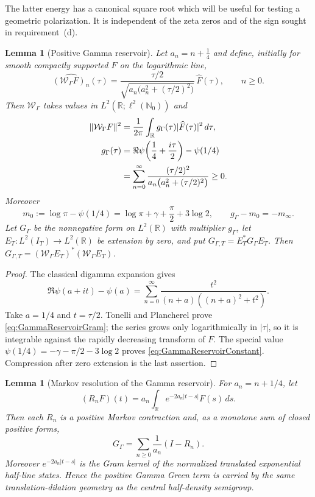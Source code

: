 \documentclass[11pt]{amsart}
\newtheorem{lemma}[theorem]{Lemma}
\theoremstyle{definition}
\theoremstyle{remark}
\newcommand{\R}{\mathbb R}
\begin{document}
The latter energy has a canonical square root which will be useful for
testing a geometric polarization.  It is independent of the zeta zeros and
of the sign sought in requirement~(d).

\begin{lemma}[Positive Gamma reservoir]
\label{lem:positiveGammaReservoir}
Let $a_n=n+\frac14$ and define, initially for smooth compactly supported
$F$ on the logarithmic line,
\begin{equation}\label{eq:GammaReservoirMap}
 \widehat{(\mathcal W_\Gamma F)_n}(\tau)
 =\frac{\tau/2}{
 \sqrt{a_n\bigl(a_n^2+(\tau/2)^2\bigr)}}\,\widehat F(\tau),
 \qquad n\ge0.
\end{equation}
Then $\mathcal W_\Gamma$ takes values in
$L^2(\mathbb R;\ell^2(\mathbb N_0))$ and
\begin{align}
 \|\mathcal W_\Gamma F\|^2
 &=\frac1{2\pi}\int_{\mathbb R}g_\Gamma(\tau)
       |\widehat F(\tau)|^2\,d\tau,\label{eq:GammaReservoirGram}\\
 g_\Gamma(\tau)
 &=\Re\psi\!\left(\frac14+\frac{i\tau}{2}\right)-\psi(1/4)
 \notag\\
 &=\sum_{n=0}^\infty
 \frac{(\tau/2)^2}
 {a_n\bigl(a_n^2+(\tau/2)^2\bigr)}\ge0.\notag
\end{align}
Moreover
\begin{equation}\label{eq:GammaReservoirConstant}
 m_0:=\log\pi-\psi(1/4)
 =\log\pi+\gamma+\frac\pi2+3\log2,
 \qquad g_\Gamma-m_0=-m_\infty.
\end{equation}
Let $G_\Gamma$ be the nonnegative form on $L^2(\R)$ with multiplier
$g_\Gamma$, let $E_T:L^2(I_T)\to L^2(\mathbb R)$ be extension by zero, and
put $G_{\Gamma,T}=E_T^*G_\Gamma E_T$.  Then
$G_{\Gamma,T}=(\mathcal W_\Gamma E_T)^*(\mathcal W_\Gamma E_T)$.
\end{lemma}

\begin{proof}
The classical digamma expansion gives
\[
 \Re\psi(a+it)-\psi(a)
 =\sum_{n=0}^\infty
 \frac{t^2}{(n+a)((n+a)^2+t^2)}.
\]
Take $a=1/4$ and $t=\tau/2$.  Tonelli and Plancherel prove
\eqref{eq:GammaReservoirGram}; the series grows only logarithmically in
$|\tau|$, so it is integrable against the rapidly decreasing transform of
$F$.  The special value
$\psi(1/4)=-\gamma-\pi/2-3\log2$ proves
\eqref{eq:GammaReservoirConstant}.  Compression after zero extension is the
last assertion.
\end{proof}

\begin{lemma}[Markov resolution of the Gamma reservoir]
\label{lem:GammaMarkovResolution}
For $a_n=n+1/4$, let
\[
 (R_nF)(t)=a_n\int_{\mathbb R}e^{-2a_n|t-s|}F(s)\,ds.
\]
Then each $R_n$ is a positive Markov contraction and, as a monotone sum of
closed positive forms,
\begin{equation}\label{eq:GammaMarkovResolution}
 G_\Gamma=\sum_{n\ge0}\frac1{a_n}(I-R_n).
\end{equation}
Moreover $e^{-2a_n|t-s|}$ is the Gram kernel of the normalized translated
exponential half-line states.  Hence the positive Gamma Green term is carried
by the same translation-dilation geometry as the central half-density
semigroup.
\end{lemma}
\end{document}
